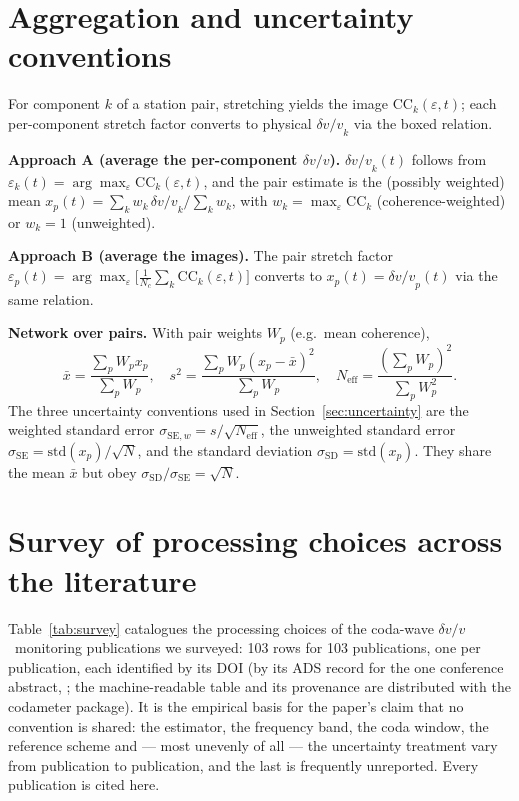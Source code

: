 \documentclass[
  referee]{gji}
\providecommand{\dvv}{\ensuremath{\delta v/v}}
\begin{document}
\section{Aggregation and uncertainty conventions}\label{app:aggregation}

For component \(k\) of a station pair, stretching yields the image
\(\mathrm{CC}_k(\varepsilon,t)\); each per-component stretch factor
converts to physical \(\dvv_k\) via the boxed relation.

\textbf{Approach A (average the per-component \dvv).} \(\dvv_k(t)\)
follows from \(\varepsilon_k(t)=\arg\max_{\varepsilon}
\mathrm{CC}_k(\varepsilon,t)\), and the pair estimate is the (possibly
weighted) mean \(x_p(t)=\sum_k w_k\,\dvv_k/\sum_k w_k\), with
\(w_k=\max_{\varepsilon}
\mathrm{CC}_k\) (coherence-weighted) or \(w_k=1\) (unweighted).

\textbf{Approach B (average the images).} The pair stretch factor
\(\varepsilon_p(t)=\arg\max_{\varepsilon}\big[\tfrac1{N_c}\sum_k
\mathrm{CC}_k(\varepsilon,t)\big]\) converts to \(x_p(t)=\dvv_p(t)\) via
the same relation.

\textbf{Network over pairs.} With pair weights \(W_p\) (e.g.~mean
coherence), \begin{equation}
\bar x=\frac{\sum_p W_p x_p}{\sum_p W_p},\quad
s^2=\frac{\sum_p W_p (x_p-\bar x)^2}{\sum_p W_p},\quad
N_{\mathrm{eff}}=\frac{(\sum_p W_p)^2}{\sum_p W_p^2}.
\end{equation} The three uncertainty conventions used in
Section~\ref{sec:uncertainty} are the weighted standard error
\(\sigma_{\mathrm{SE},w}=s/\sqrt{N_{\mathrm{eff}}}\), the unweighted
standard error \(\sigma_{\mathrm{SE}}=\mathrm{std}(x_p)/\sqrt{N}\), and
the standard deviation \(\sigma_{\mathrm{SD}}=\mathrm{std}(x_p)\). They
share the mean \(\bar x\) but obey
\(\sigma_{\mathrm{SD}}/\sigma_{\mathrm{SE}}=\sqrt{N}\).

\section{Survey of processing choices across the
literature}\label{app:survey}

Table~\ref{tab:survey} catalogues the processing choices of the
coda-wave \dvv~monitoring publications we surveyed: 103 rows for 103
publications, one per publication, each identified by its DOI (by its
ADS record for the one conference abstract, \citet{Kristjansdottir2019};
the machine-readable table and its provenance are distributed with the
codameter package). It is the empirical basis for the paper's claim that
no convention is shared: the estimator, the frequency band, the coda
window, the reference scheme and --- most unevenly of all --- the
uncertainty treatment vary from publication to publication, and the last
is frequently unreported. Every publication is cited here.
\end{document}
